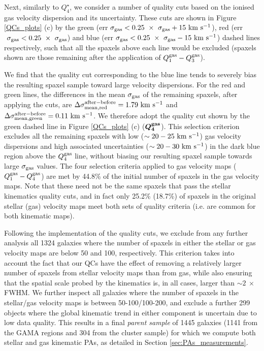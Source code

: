 \documentclass[fleqn,usenatbib]{mnras}
\begin{document}
Next, similarly to $Q_{4}^{\star}$, we consider a number of quality cuts based on the ionised gas velocity dispersion and its uncertainty. These cuts are shown in Figure \ref{QCs_plots} (c) by the green (err$\ \sigma_{\rm{gas}} < 0.25\ \times \ \sigma_{\rm{gas}} + 15\ \rm{km\ s^{-1}}$), red (err$\ \sigma_{\rm{gas}} < 0.25\ \times \ \sigma_{\rm{gas}}$) and blue (err$\ \sigma_{\rm{gas}} < 0.25\ \times \ \sigma_{\rm{gas}} - 15\ \rm{km\ s^{-1}}$) dashed lines respectively, such that all the spaxels above each line would be excluded (spaxels shown are those remaining after the application of $ Q_{1}^{\rm{gas}}-Q_{3}^{\rm{gas}}$). 

We find that the quality cut corresponding to the blue line tends to severely bias the resulting spaxel sample toward large velocity dispersions. For the red and green lines, the differences in the mean $\sigma_{\rm{gas}}$ of the remaining spaxels, after applying the cuts, are $\Delta\sigma_{\rm{ mean,red}}^{\rm{after-before}} = 1.79\ \rm{km\ s^{-1}}$  and  $\Delta\sigma_{\rm{mean,green}}^{\rm{after-before}} = 0.11\ \rm{km\ s^{-1}}$. We therefore adopt the quality cut shown by the green dashed line in Figure \ref{QCs_plots} (c) ($\boldsymbol{Q_{4}^{\rm{gas}}}$). This selection criterion excludes all the remaining spaxels with low ($\sim20-25\ \rm{km\ s^{-1}}$) gas velocity dispersions and high associated uncertainties ($\sim20-30\ \rm{km\ s^{-1}}$) in the dark blue region above the $Q_{4}^{\rm{gas}}$ line, without biasing our resulting spaxel sample towards large $\sigma_{\rm{gas}}$ values. The four selection criteria applied to gas velocity maps ($ Q_{1}^{\rm{gas}}-Q_{4}^{\rm{gas}} $) are met by 44.8\% of the initial number of spaxels in the gas velocity maps. 
Note that these need not be the same spaxels that pass the stellar kinematics quality cuts, and in fact only 25.2\% (18.7\%) of spaxels in the original stellar (gas) velocity maps meet both sets of quality criteria (i.e. are common for both kinematic maps).

Following the implementation of the quality cuts, we exclude from any further analysis all 1324 galaxies where the number of spaxels in either the stellar or gas velocity maps are below 50 and 100, respectively. This criterion takes into account the fact that our QCs have the effect of removing a relatively larger number of spaxels from stellar velocity maps than from gas, while also ensuring that the spatial scale probed by the kinematics is, in all cases, larger than $\sim 2\ \times\ $FWHM.  We further inspect all galaxies where the number of spaxels in the stellar/gas velocity maps is between 50-100/100-200, and exclude a further 299 objects where the global kinematic trend in either component is uncertain due to low data quality. This results in a final \textit{parent sample} of 1445 galaxies (1141 from the GAMA regions and 304 from the cluster sample) for which we compute both stellar and gas kinematic PAs, as detailed in Section \ref{sec:PAs_measurements}. 
\end{document}
